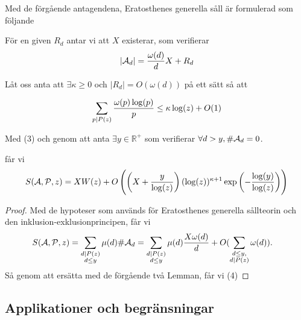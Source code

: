 Med de förgående antagendena, Eratosthenes generella såll är formulerad som följande\cite{Dalton}
\begin{theorem}\hfill

För en given $ R_{d} $ antar vi att $ X $ existerar, som verifierar
\[\vert\mathcal{A}_{d}\vert =\frac{\omega(d)}{d}X +R_{d} \]

Låt oss anta att $ \exists \kappa\geq 0 $ och $ \vert R_{d}\vert = O(\omega(d))$ på ett sätt så att

\[\sum_{p\mid P(z)}\frac{\omega(p)\log(p)}{p}\leq \kappa \log(z)+O(1)\]


Med (3) och genom att anta $ \exists y\in \mathbb{R}^{+} $ som verifierar $ \forall d>y, \# \mathcal{A}_d=0 $.

får vi
\begin{equation}
\label{equationEL4}
S(\mathcal{\mathcal{A}}, \mathcal{\mathcal{P}}, z)= XW(z)+O\left( \left( X+\frac{y}{\log(z)} \right)(\log(z))^{\kappa+1}\exp \left( -\frac{\log(y)}{\log(z)} \right) \right)
\end{equation}
\end{theorem}
\begin{proof}
Med de hypoteser som används för Eratosthenes generella sållteorin och den inklusion-exklusionprincipen, får vi
\begin{align*}
S(\mathcal{\mathcal{A}}, \mathcal{\mathcal{P}}, z) &=\sum_{\substack{d\mid P(z)\\d\leq y}}\mu(d)\#\mathcal{A}_{d} =\sum_{\substack{d\mid P(z)\\d\leq y}}\mu(d)\frac{X\omega(d)}{d}+O(\sum_{\substack{d\leq y,\\ d \mid P(z)}} \omega(d)).
\end{align*}
Så genom att ersätta med de förgående två Lemman, får vi (4)
\end{proof}


\subsection{Applikationer och begränsningar}

